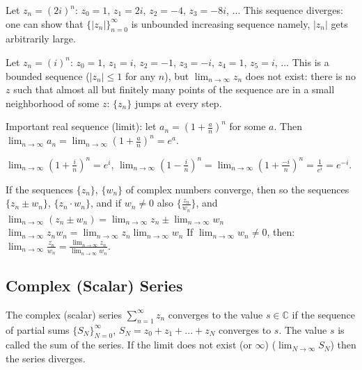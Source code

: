 \documentclass[12pt]{article}
\begin{document}
\begin{example}
Let $z_n = (2i)^n$: $z_0 = 1$, $z_1 = 2i$, $z_2 = -4$, $z_3 = -8i$, ...
This sequence diverges: one can show that $\{|z_n|\}_{n=0}^\infty$ is unbounded increasing sequence {namely, $|z_n|$ gets arbitrarily large}.
\end{example}

\begin{example}
Let $z_n = (i)^n$: $z_0 = 1$, $z_1 = i$, $z_2 = -1$, $z_3 = -i$, $z_4 = 1$, $z_5 = i$, ...
This is a bounded sequence ($|z_n| \leq 1$ for any $n$), but $\lim_{n\to\infty} z_n$ does not exist: there is no $z$ such that almost all but finitely many points of the sequence are in a small neighborhood of some $z$: $\{z_n\}$ jumps at every step.
\end{example}

\begin{example}
Important real sequence (limit): let $a_n = (1 + \frac{a}{n})^n$ for some $a$. Then $\lim_{n\to\infty} a_n = \lim_{n\to\infty} (1 + \frac{a}{n})^n = e^a$.
\end{example}

\begin{example}
$\lim_{n\to\infty} (1 + \frac{i}{n})^n = e^i$, $\lim_{n\to\infty} (1 - \frac{i}{n})^n = \lim_{n\to\infty} (1 + \frac{-i}{n})^n = \frac{1}{e^i} = e^{-i}$.
\end{example}

\begin{proposition}
If the sequences $\{z_n\}$, $\{w_n\}$ of complex numbers converge, then so the sequences $\{z_n \pm w_n\}$, $\{z_n \cdot w_n\}$, and if $w_n \neq 0$ also $\{\frac{z_n}{w_n}\}$, and
$\lim_{n\to\infty} (z_n \pm w_n) = \lim_{n\to\infty} z_n \pm \lim_{n\to\infty} w_n$
$\lim_{n\to\infty} z_n w_n = \lim_{n\to\infty} z_n \lim_{n\to\infty} w_n$
If $\lim_{n\to\infty} w_n \neq 0$, then: $\lim_{n\to\infty} \frac{z_n}{w_n} = \frac{\lim_{n\to\infty} z_n}{\lim_{n\to\infty} w_n}$.
\end{proposition}

\subsection{Complex (Scalar) Series}

\begin{definition}
The complex (scalar) series $\sum_{n=1}^\infty z_n$ converges to the value $s \in \mathbb{C}$ if the sequence of partial sums $\{S_N\}_{N=0}^\infty$, $S_N = z_0 + z_1 + ... + z_N$ converges to $s$. The value $s$ is called the sum of the series. If the limit does not exist (or $\infty$) ($\lim_{N\to\infty} S_N$) then the series diverges.
\end{definition}
\end{document}
